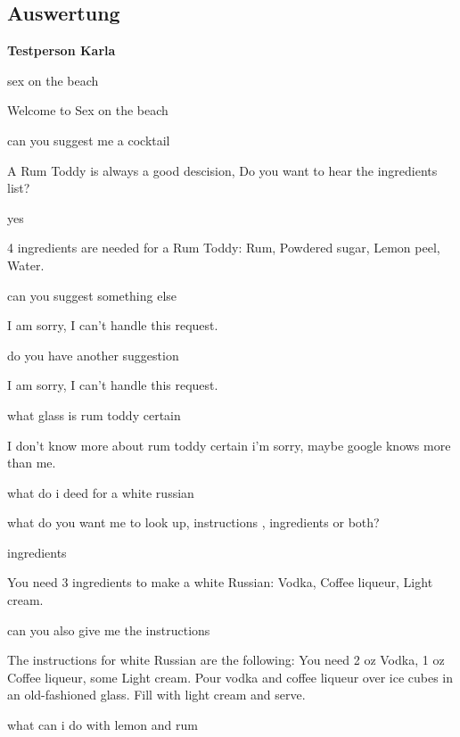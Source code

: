 \documentclass[12pt,letterpaper]{article}
\begin{document}
\subsection{Auswertung}
\textbf{Testperson Karla}
\begin{dialogue}
 sex on the beach

 Welcome to Sex on the beach

 can you suggest me a cocktail

 A Rum Toddy is always a good descision, Do you want to hear the ingredients list?

 yes

 4 ingredients are needed for a Rum Toddy: Rum, Powdered sugar, Lemon peel, Water.

 can you suggest something else

 I am sorry, I can't handle this request.\\

 do you have another suggestion

 I am sorry, I can't handle this request.

 what glass is rum toddy certain

 I don't know more about rum toddy certain i'm sorry, maybe google knows more than me.\\

 what do i deed for a white russian

 what do you want me to look up, instructions , ingredients or both?

 ingredients

 You need 3 ingredients to make a white Russian: Vodka, Coffee liqueur, Light cream.

 can you also give me the instructions

 The instructions for white Russian are the following: You need 2 oz Vodka, 1 oz Coffee liqueur, some Light cream. Pour vodka and coffee liqueur over ice cubes in an old-fashioned glass. Fill with light cream and serve.

 what can i do with lemon and rum


\end{dialogue}
\end{document}
